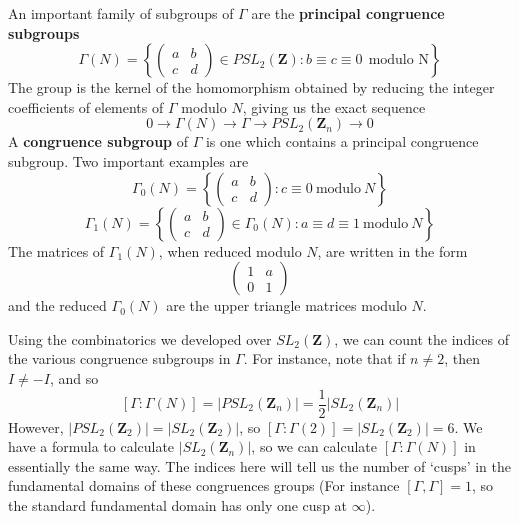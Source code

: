 An important family of subgroups of $\Gamma$ are the {\bf principal congruence subgroups}
%
\[ \Gamma(N) = \left\{ \begin{pmatrix} a & b \\ c & d \end{pmatrix} \in PSL_2(\mathbf{Z}) : b \equiv c \equiv 0\ \ \text{modulo N} \right\} \]
%
The group is the kernel of the homomorphism obtained by reducing the integer coefficients of elements of $\Gamma$ modulo $N$, giving us the exact sequence
%
\[ 0 \to \Gamma(N) \to \Gamma \to PSL_2(\mathbf{Z}_n) \to 0 \]
%
A {\bf congruence subgroup} of $\Gamma$ is one which contains a principal congruence subgroup. Two important examples are
%
\[ \Gamma_0(N) = \left\{ \begin{pmatrix} a & b \\ c & d \end{pmatrix} : c \equiv 0\ \text{modulo}\ N \right\} \]
\[ \Gamma_1(N) = \left\{ \begin{pmatrix} a & b \\ c & d \end{pmatrix} \in \Gamma_0(N) : a \equiv d \equiv 1\ \text{modulo}\ N \right\} \]
%
The matrices of $\Gamma_1(N)$, when reduced modulo $N$, are written in the form
%
\[ \begin{pmatrix} 1 & a \\ 0 & 1 \end{pmatrix} \]
%
and the reduced $\Gamma_0(N)$ are the upper triangle matrices modulo $N$.

Using the combinatorics we developed over $SL_2(\mathbf{Z})$, we can count the indices of the various congruence subgroups in $\Gamma$. For instance, note that if $n \neq 2$, then $I \neq -I$, and so
%
\[ [\Gamma: \Gamma(N)] = |PSL_2(\mathbf{Z}_n)| = \frac{1}{2} |SL_2(\mathbf{Z}_n)| \]
%
However, $|PSL_2(\mathbf{Z}_2)| = |SL_2(\mathbf{Z}_2)|$, so $[\Gamma: \Gamma(2)] = |SL_2(\mathbf{Z}_2)| = 6$. We have a formula to calculate $|SL_2(\mathbf{Z}_n)|$, so we can calculate $[\Gamma: \Gamma(N)]$ in essentially the same way. The indices here will tell us the number of `cusps' in the fundamental domains of these congruences groups (For instance $[\Gamma, \Gamma] = 1$, so the standard fundamental domain has only one cusp at $\infty$).

